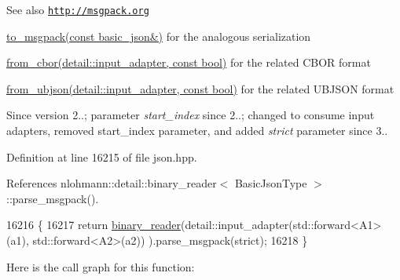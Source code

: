 \begin{DoxySeeAlso}{See also}
\href{http://msgpack.org}{\tt http\+://msgpack.\+org} 

\hyperlink{classnlohmann_1_1basic__json_a09ca1dc273d226afe0ca83a9d7438d9c}{to\+\_\+msgpack(const basic\+\_\+json\&)} for the analogous serialization 

\hyperlink{classnlohmann_1_1basic__json_aa9be366b887378bb10c0f1ab510c2f0c}{from\+\_\+cbor(detail\+::input\+\_\+adapter, const bool)} for the related C\+B\+OR format 

\hyperlink{classnlohmann_1_1basic__json_afc590e292274a032cb0142d27778738e}{from\+\_\+ubjson(detail\+::input\+\_\+adapter, const bool)} for the related U\+B\+J\+S\+ON format
\end{DoxySeeAlso}
\begin{DoxySince}{Since}
version 2..; parameter {\itshape start\+\_\+index} since 2..; changed to consume input adapters, removed start\+\_\+index parameter, and added {\itshape strict} parameter since 3.. 
\end{DoxySince}


Definition at line 16215 of file json.\+hpp.



References nlohmann\+::detail\+::binary\+\_\+reader$<$ Basic\+Json\+Type $>$\+::parse\+\_\+msgpack().


\begin{DoxyCode}
16216     \{
16217         \textcolor{keywordflow}{return} \hyperlink{classnlohmann_1_1basic__json_a7e06ed27ff517575ccb23fc23fca2b8f}{binary\_reader}(detail::input\_adapter(std::forward<A1>(a1), std::forward<A2>(a2))
      ).parse\_msgpack(strict);
16218     \}
\end{DoxyCode}
Here is the call graph for this function\+:
\mbox{\label{classnlohmann_1_1basic__json_afc590e292274a032cb0142d27778738e}} 
